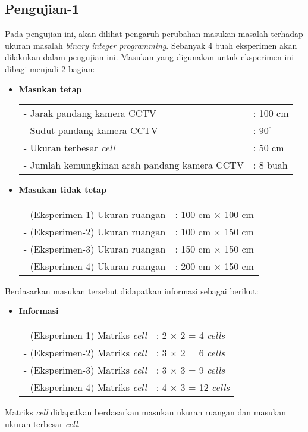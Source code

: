 \subsection{Pengujian-1}
Pada pengujian ini, akan dilihat pengaruh perubahan masukan masalah terhadap ukuran masalah \textit{binary integer programming}. Sebanyak 4 buah eksperimen akan dilakukan dalam pengujian ini. Masukan yang digunakan untuk eksperimen ini dibagi menjadi 2 bagian:
\begin{itemize}
	\item \textbf{Masukan tetap}\\
	\begin{tabular}{ll}
		- Jarak pandang kamera CCTV &: 100 cm\\
		- Sudut pandang kamera CCTV &: $90^\circ$\\
		- Ukuran terbesar \textit{cell} &: 50 cm\\
		- Jumlah kemungkinan arah pandang kamera CCTV &: 8 buah\\
	\end{tabular}
	\item \textbf{Masukan tidak tetap}\\
	\begin{tabular}{ll}
		- (Eksperimen-1) Ukuran ruangan &: 100 cm $\times$ 100 cm\\
		- (Eksperimen-2) Ukuran ruangan &: 100 cm $\times$ 150 cm\\
		- (Eksperimen-3) Ukuran ruangan &: 150 cm $\times$ 150 cm\\
		- (Eksperimen-4) Ukuran ruangan &: 200 cm $\times$ 150 cm\\
	\end{tabular}
\end{itemize}
Berdasarkan masukan tersebut didapatkan informasi sebagai berikut:
\begin{itemize}
	\item \textbf{Informasi}\\
	\begin{tabular}{ll}
		- (Eksperimen-1) Matriks \textit{cell} &: 2 $\times$ 2 = 4 \textit{cells}\\
		- (Eksperimen-2) Matriks \textit{cell} &: 3 $\times$ 2 = 6 \textit{cells}\\
		- (Eksperimen-3) Matriks \textit{cell} &: 3 $\times$ 3 = 9 \textit{cells}\\
		- (Eksperimen-4) Matriks \textit{cell} &: 4 $\times$ 3 = 12 \textit{cells}\\
	\end{tabular}
\end{itemize}
Matriks \textit{cell} didapatkan berdasarkan masukan ukuran ruangan dan masukan ukuran terbesar \textit{cell}.

